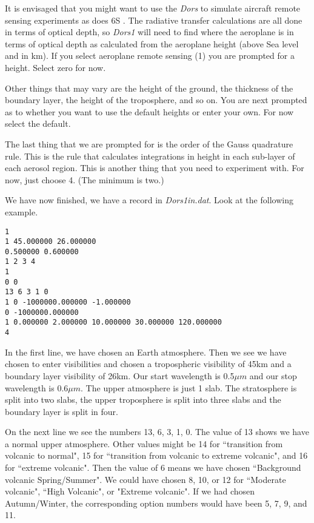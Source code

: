 \documentclass[12pt]{article}
\begin{document}
It is envisaged that you might want to use the {\it Dors} to simulate aircraft remote sensing
experiments as does 6S \cite{6S:MyBib}. The radiative transfer calculations are all done
in terms of optical depth, so {\it Dors1} will need to find where the aeroplane is
in terms of optical depth as calculated from the aeroplane height (above Sea level and in km). If you select
aeroplane remote sensing (1) you are prompted for a height. Select zero for now.

Other things that may vary are the height of the ground, the thickness of the boundary layer,
 the height of the troposphere, and so on. You are next prompted as to whether you want to
use the default heights or enter your own. For now select the default.

The last thing that we are prompted for is the order of the Gauss quadrature rule.
This is the rule that calculates integrations in height in each sub-layer of each
aerosol region. This is another thing that you need to experiment with. For now, just choose 4.
(The minimum is two.)

We have now finished, we have a record in {\it Dors1in.dat}. Look at the following example.
\begin{verbatim}
1 
1 45.000000 26.000000
0.500000 0.600000 
1 2 3 4
1
0 0
13 6 3 1 0
1 0 -1000000.000000 -1.000000
0 -1000000.000000
1 0.000000 2.000000 10.000000 30.000000 120.000000
4 
\end{verbatim}
In the first line, we have chosen an Earth atmosphere. Then we see we have chosen
to enter visibilities and chosen a tropospheric visibility of 45km and a boundary layer visibility
of 26km. Our start wavelength is 0.5$\mu m$ and our stop wavelength is $0.6 \mu m$. The
upper atmosphere is just 1 slab. The stratosphere is split into two slabs, the upper
troposphere is split into three slabs and the boundary layer is split in four.

On the next line we see the numbers 13, 6, 3, 1, 0.
The value of 13 shows we have a normal upper atmosphere. Other values might be 14 for ``transition
from volcanic to normal", 15 for ``transition from volcanic to extreme volcanic", and 16 for
 ``extreme volcanic". Then the value of 6 means we have chosen ``Background volcanic Spring/Summer".
We could have chosen 8, 10, or 12 for ``Moderate volcanic", ``High Volcanic", or "Extreme volcanic".
If we had chosen Autumn/Winter, the corresponding option numbers would have been 5, 7, 9, and 11.
\end{document}
